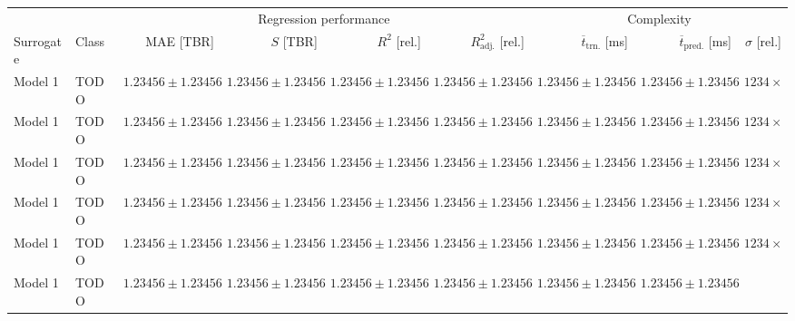\begin{table}[h]
	\centering
	{\footnotesize
		\begin{tabular}{llrrrrrrr}
		\toprule
		{} & {} & \multicolumn{4}{c}{Regression performance} &
		\multicolumn{3}{c}{Complexity}\\
		\cmidrule(lr){3-6}
		\cmidrule(lr){7-9}
		Surrogate & Class & MAE [TBR] & $S$ [TBR] & $R^2$ [rel.] & $R^2_{\text{adj.}}$ [rel.]
						& $\overline{t}_{\text{trn.}}$ [ms] &
		$\overline{t}_{\text{pred.}}$ [ms] & $\sigma$ [rel.]\\
		\midrule
		Model 1
						& TODO
						& $\num{1.23456} \pm \num{1.23456}$
						& $\num{1.23456} \pm \num{1.23456}$
						& $\num{1.23456} \pm \num{1.23456}$
						& $\num{1.23456} \pm \num{1.23456}$
						& $\num{1.23456} \pm \num{1.23456}$
						& $\num{1.23456} \pm \num{1.23456}$
						& $\num{1234}\times$
		\\
		Model 1
						& TODO
						& $\num{1.23456} \pm \num{1.23456}$
						& $\num{1.23456} \pm \num{1.23456}$
						& $\num{1.23456} \pm \num{1.23456}$
						& $\num{1.23456} \pm \num{1.23456}$
						& $\num{1.23456} \pm \num{1.23456}$
						& $\num{1.23456} \pm \num{1.23456}$
						& $\num{1234}\times$
		\\
		Model 1
						& TODO
						& $\num{1.23456} \pm \num{1.23456}$
						& $\num{1.23456} \pm \num{1.23456}$
						& $\num{1.23456} \pm \num{1.23456}$
						& $\num{1.23456} \pm \num{1.23456}$
						& $\num{1.23456} \pm \num{1.23456}$
						& $\num{1.23456} \pm \num{1.23456}$
						& $\num{1234}\times$
		\\
		Model 1
						& TODO
						& $\num{1.23456} \pm \num{1.23456}$
						& $\num{1.23456} \pm \num{1.23456}$
						& $\num{1.23456} \pm \num{1.23456}$
						& $\num{1.23456} \pm \num{1.23456}$
						& $\num{1.23456} \pm \num{1.23456}$
						& $\num{1.23456} \pm \num{1.23456}$
						& $\num{1234}\times$
		\\
		Model 1
						& TODO
						& $\num{1.23456} \pm \num{1.23456}$
						& $\num{1.23456} \pm \num{1.23456}$
						& $\num{1.23456} \pm \num{1.23456}$
						& $\num{1.23456} \pm \num{1.23456}$
						& $\num{1.23456} \pm \num{1.23456}$
						& $\num{1.23456} \pm \num{1.23456}$
						& $\num{1234}\times$
		\\
		Model 1
						& TODO
						& $\num{1.23456} \pm \num{1.23456}$
						& $\num{1.23456} \pm \num{1.23456}$
						& $\num{1.23456} \pm \num{1.23456}$
						& $\num{1.23456} \pm \num{1.23456}$
						& $\num{1.23456} \pm \num{1.23456}$
						& $\num{1.23456} \pm \num{1.23456}$

\end{tabular}}
\end{table}
